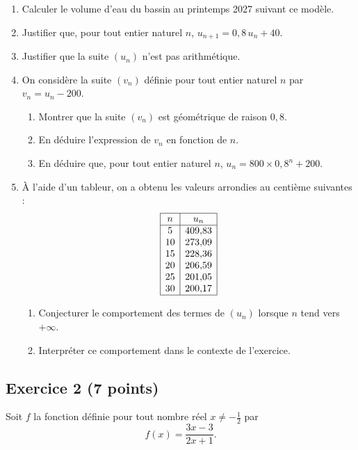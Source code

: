\documentclass[a4paper,12pt]{article}
\newcommand{\reponse}{\par\vspace{0.5cm}
\framebox[\linewidth]{\begin{minipage}{\dimexpr\linewidth-2\fboxsep}
\vspace{2cm}\hspace{0.5cm}
\end{minipage}}\vspace{0.5cm}
}
\begin{document}
\begin{enumerate}
\item Calculer le volume d'eau du bassin au printemps 2027 suivant ce modèle. \reponse
\item Justifier que, pour tout entier naturel \(n\), \(u_{n+1} = 0{,}8\,u_n + 40\). \reponse
\item Justifier que la suite \((u_n)\) n'est pas arithmétique. \reponse
\item On considère la suite \((v_n)\) définie pour tout entier naturel \(n\) par \(v_n = u_n - 200\).
\begin{enumerate}
\item Montrer que la suite \((v_n)\) est géométrique de raison \(0{,}8\). \reponse
\item En déduire l'expression de \(v_n\) en fonction de \(n\). \reponse
\item En déduire que, pour tout entier naturel \(n\), \(u_n = 800 \times 0{,}8^n + 200\). \reponse
\end{enumerate}
\item À l'aide d'un tableur, on a obtenu les valeurs arrondies au centième suivantes :
\[
\begin{array}{|c|c|}
\hline
n & u_n \\
\hline
5 & 409{,}83 \\
10 & 273{,}09 \\
15 & 228{,}36 \\
20 & 206{,}59 \\
25 & 201{,}05 \\
30 & 200{,}17 \\
\hline
\end{array}
\]
\begin{enumerate}
\item Conjecturer le comportement des termes de \((u_n)\) lorsque \(n\) tend vers \(+\infty\). \reponse
\item Interpréter ce comportement dans le contexte de l'exercice. \reponse
\end{enumerate}
\end{enumerate}

\subsection*{Exercice 2 (7 points)}
Soit \(f\) la fonction définie pour tout nombre réel \(x \neq -\frac{1}{2}\) par
\[
f(x) = \frac{3x - 3}{2x + 1}.
\]
\end{document}
